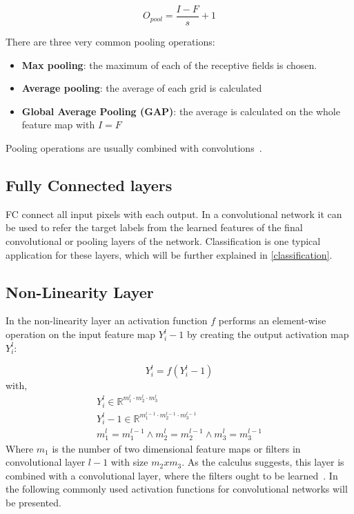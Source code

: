 \begin{equation}
    O_{pool}=\frac{I-F}{s}+1
\end{equation}

There are three very common pooling operations:
\begin{itemize}
    \item \textbf{Max pooling}: the maximum of each of the receptive fields is chosen.
    \item \textbf{Average pooling}: the average of each grid is calculated
    \item \textbf{Global Average Pooling (GAP)}: the average is calculated on the whole feature map with $I=F$
\end{itemize}
Pooling operations are usually combined with convolutions~\cite{advanceddeeplearningpython}.

\subsection{Fully Connected layers}
\gls{FC} connect all input pixels with each output.
In a convolutional network it can be used to refer the target labels from the learned features of the final convolutional
or pooling layers of the network.
Classification is one typical application for these layers, which will be further explained in \autoref{classification}.


\subsection{Non-Linearity Layer}
In the non-linearity layer an activation function $f$ performs an element-wise operation on the input feature map
$Y_i^l-1$ by creating the output activation map $Y_i^l$:

\begin{equation}
    Y_i^l=f(Y_i^l-1)
\end{equation}
with,
\begin{align}
    Y_i^l\in\mathbb{R}^{m_1^l\cdot m_2^l\cdot m_3^l} \\
    Y_i^l-1\in\mathbb{R}^{m_1^{l-1}\cdot m_2^{l-1}\cdot m_3^{l-1}} \\
    m_1^l = m_1^{l-1} \land m_2^l = m_2^{l-1} \land m_3^l = m_3^{l-1}
\end{align}
Where $m_1$ is the number of two dimensional feature maps or filters in convolutional layer $l-1$
with size $m_2 x m_3$.
As the calculus suggests, this layer is combined with a convolutional layer, where the filters ought to be
 learned~\cite{wikitumcnn}.
In the following commonly used activation functions for convolutional networks will be presented.

